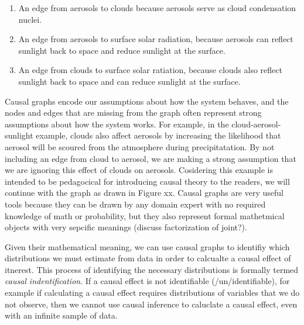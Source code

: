 \documentclass[12pt]{article}
\begin{document}
\begin{enumerate}
\item An edge from aerosols to clouds because aerosols serve as cloud
condensation nuclei.
\item An edge from aerosols to surface solar radiation, because
aerosols can reflect sunlight back to space and reduce sunlight
at the surface.
\item An edge from clouds to surface solar ratiation, because clouds
also reflect sunlight back to space and can reduce sunlight at
the surface.
\end{enumerate}

Causal graphs encode our assumptions about how the system behaves,
and the nodes and edges that are missing from the graph often
represent strong assumptions about how the system works. For
example, in the cloud-aerosol-sunlight example, clouds also affect
aerosols by increasing the likelihood that aerosol will be scoured
from the atmosphere during precipitatation. By not including an
edge from cloud to aerosol, we are making a strong assumption that
we are ignoring this effect of clouds on aerosols. Cosidering this
example is intended to be pedagocical for introducing causal theory
to the readers, we will continue with the graph as drawn in Figure
xx. Causal graphs are very useful tools because they can be drawn
by any domain expert with no required knowledge of math or
probability, but they also represent formal mathetmical objects
with very sepcific meanings (discuss factorization of joint?).


Given their mathematical meaning, we can use causal graphs to
identifiy which distributions we must estimate from data in order
to calcualte a causal effect of itnerest. This process of
identifying the necessary distributions is formally termed
\emph{causal indentification}. If a causal effect is not
identifiable (/un/identifiable), for example if
calculating a causal effect requires distributions of variables
that we do not observe, then we cannot use causal inference to
caluclate a causal effect, even with an infinite sample of data.

\end{document}
